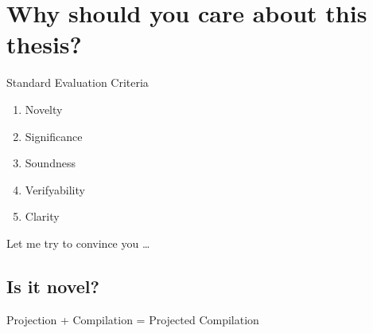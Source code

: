 \documentclass[
	aspectratio=169, %
	8pt, %
]{beamer}
\begin{document}
\section{Why should you care about this thesis?}

\begin{frame}{\insertsection}
	\Large
	Standard Evaluation Criteria
	
	\begin{enumerate}
		\item Novelty
		\item Significance
		\item Soundness
		\item Verifyability
		\item Clarity
	\end{enumerate}
	
	Let me try to convince you \ldots
\end{frame}

\subsection{Is it novel?}
\begin{frame}{\insertsubsection\hfill{}Projection + Compilation = Projected Compilation}
\end{frame}
\end{document}
